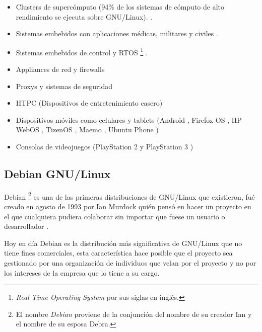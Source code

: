 \begin{itemize}
  \item Clusters de superc\'{o}mputo (94\% de los sistemas de c\'{o}mputo de alto rendimiento se ejecuta sobre GNU/Linux). \cite{_tic_????}\cite{_94_????}.
  \item Sistemas embebidos con aplicaciones m\'{e}dicas, militares y civiles \cite{_elinux.org_????}\cite{_rtos_????}.
  \item Sistemas embebidos de control y \textsc{RTOS} \footnote{\textit{Real Time Operating System} por sus siglas en ingl\'{e}s.} \cite{_uclinux_????}\cite{_rtos_????}.
  \item Appliances de red y firewalls \cite{_router/bridge_????}\cite{_endian_????}
  \item Proxys y sistemas de seguridad \cite{_f5_????}\cite{_junos_????}\cite{_infoblox_????}
  \item \textsc{HTPC} (Dispositivos de entretenimiento casero) \cite{_openelec_????}
  \item Dispositivos m\'{o}viles como celulares y tablets (Android \cite{_android_????}, Firefox OS \cite{_firefox_????}, HP WebOS \cite{_hp_????}, TizenOS \cite{_tizen_????}, Maemo \cite{_maemo.org_????}, Ubuntu Phone \cite{_ubuntu_????})
  \item Consolas de videojuegos (PlayStation 2 \cite{_ps2_????} y PlayStation 3 \cite{_open_????})
\end{itemize}


  \subsection {Debian GNU/Linux}

Debian \footnote{El nombre \textit{Debian} proviene de la conjunci\'{o}n del nombre de su creador Ian y el nombre de su esposa Debra.} es una de las primeras distribuciones de GNU/Linux que existieron, fu\'{e} creado en agosto de 1993 por Ian Murdock qui\'{e}n pens\'{o} en hacer un proyecto en el que cualquiera pudiera colaborar sin importar que fuese un usuario o desarrollador \cite{_debian_????}.

Hoy en d\'{i}a Debian es la distribuci\'{o}n m\'{a}s significativa de GNU/Linux que no tiene fines comerciales, esta caracter\'{i}stica hace posible que el proyecto sea gestionado por una organizaci\'{o}n de individuos que velan por el proyecto y no por los intereses de la empresa que lo tiene a su cargo.

